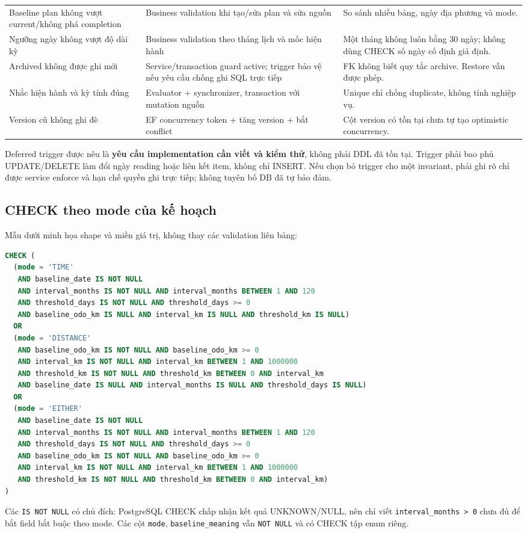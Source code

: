 \begin{smalltable}
\begin{longtable}{L{3.0cm}L{3.2cm}L{8.2cm}}
Baseline plan không vượt current/không phá completion & Business validation khi tạo/sửa plan và sửa nguồn & So sánh nhiều bảng, ngày địa phương và mode.\\
Ngưỡng ngày không vượt độ dài kỳ & Business validation theo tháng lịch và mốc hiện hành & Một tháng không luôn bằng 30 ngày; không dùng CHECK số ngày cố định giả định.\\
Archived không được ghi mới & Service/transaction guard active; trigger bảo vệ nếu yêu cầu chống ghi SQL trực tiếp & FK không biết quy tắc archive. Restore vẫn được phép.\\
Nhắc hiện hành và kỳ tính đúng & Evaluator + synchronizer, transaction với mutation nguồn & Unique chỉ chống duplicate, không tính nghiệp vụ.\\
Version cũ không ghi đè & EF concurrency token + tăng version + bắt conflict & Cột version có tồn tại chưa tự tạo optimistic concurrency.\\
\bottomrule\end{longtable}\end{smalltable}
Deferred trigger được nêu là \textbf{yêu cầu implementation cần viết và kiểm thử}, không phải DDL đã tồn tại. Trigger phải bao phủ UPDATE/DELETE làm đổi ngày reading hoặc liên kết item, không chỉ INSERT. Nếu chọn bỏ trigger cho một invariant, phải ghi rõ chỉ được service enforce và hạn chế quyền ghi trực tiếp; không tuyên bố DB đã tự bảo đảm.\par
\subsection{CHECK theo mode của kế hoạch}
Mẫu dưới minh họa shape và miền giá trị, không thay các validation liên bảng:\par
\begin{lstlisting}[language=SQL]
CHECK (
  (mode = 'TIME'
   AND baseline_date IS NOT NULL
   AND interval_months IS NOT NULL AND interval_months BETWEEN 1 AND 120
   AND threshold_days IS NOT NULL AND threshold_days >= 0
   AND baseline_odo_km IS NULL AND interval_km IS NULL AND threshold_km IS NULL)
  OR
  (mode = 'DISTANCE'
   AND baseline_odo_km IS NOT NULL AND baseline_odo_km >= 0
   AND interval_km IS NOT NULL AND interval_km BETWEEN 1 AND 1000000
   AND threshold_km IS NOT NULL AND threshold_km BETWEEN 0 AND interval_km
   AND baseline_date IS NULL AND interval_months IS NULL AND threshold_days IS NULL)
  OR
  (mode = 'EITHER'
   AND baseline_date IS NOT NULL
   AND interval_months IS NOT NULL AND interval_months BETWEEN 1 AND 120
   AND threshold_days IS NOT NULL AND threshold_days >= 0
   AND baseline_odo_km IS NOT NULL AND baseline_odo_km >= 0
   AND interval_km IS NOT NULL AND interval_km BETWEEN 1 AND 1000000
   AND threshold_km IS NOT NULL AND threshold_km BETWEEN 0 AND interval_km)
)
\end{lstlisting}
Các \texttt{IS NOT NULL} có chủ đích: PostgreSQL CHECK chấp nhận kết quả UNKNOWN/NULL, nên chỉ viết \texttt{interval\_\allowbreak{}months > 0} chưa đủ để bắt field bắt buộc theo mode. Các cột \texttt{mode}, \texttt{baseline\_\allowbreak{}meaning} vẫn \texttt{NOT NULL} và có CHECK tập enum riêng.\par
